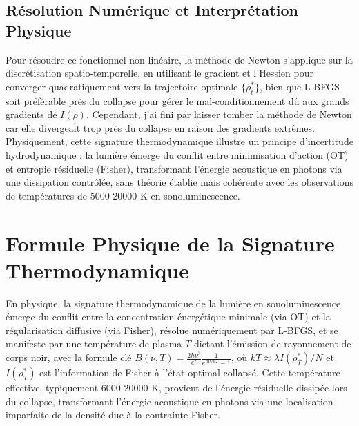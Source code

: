 \documentclass[a4paper,12pt]{article}
\begin{document}
\subsection{Résolution Numérique et Interprétation Physique}
Pour résoudre ce fonctionnel non linéaire, la méthode de Newton s'applique sur la discrétisation spatio-temporelle, en utilisant le gradient et l'Hessien pour converger quadratiquement vers la trajectoire optimale \( \{ \rho_t^* \} \), bien que L-BFGS soit préférable près du collapse pour gérer le mal-conditionnement dû aux grands gradients de \( I(\rho) \). Cependant, j'ai fini par laisser tomber la méthode de Newton car elle divergeait trop près du collapse en raison des gradients extrêmes. Physiquement, cette signature thermodynamique illustre un principe d'incertitude hydrodynamique : la lumière émerge du conflit entre minimisation d'action (OT) et entropie résiduelle (Fisher), transformant l'énergie acoustique en photons via une dissipation contrôlée, sans théorie établie mais cohérente avec les observations de températures de 5000-20000 K en sonoluminescence.
\newpage
\section{Formule Physique de la Signature Thermodynamique}
En physique, la signature thermodynamique de la lumière en sonoluminescence émerge du conflit entre la concentration énergétique minimale (via OT) et la régularisation diffusive (via Fisher), résolue numériquement par L-BFGS, et se manifeste par une température de plasma \( T \) dictant l'émission de rayonnement de corps noir, avec la formule clé \( B(\nu, T) = \frac{2 h \nu^3}{c^2} \frac{1}{e^{h \nu / k T} - 1} \), où \( k T \approx \lambda I(\rho_T^*) / N \) et \( I(\rho_T^*) \) est l'information de Fisher à l'état optimal collapsé. Cette température effective, typiquement 6000-20000 K, provient de l'énergie résiduelle dissipée lors du collapse, transformant l'énergie acoustique en photons via une localisation imparfaite de la densité due à la contrainte Fisher.
\end{document}
